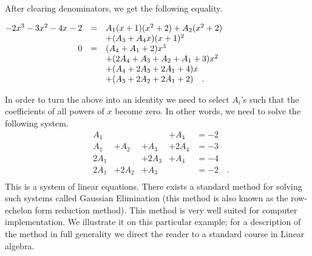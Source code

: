 {After clearing denominators, we get the following equality. 

\noindent$\begin{array}{@{}rcl@{}}
-2x^{3}-3x^{2}-4x -2 &=& A_{1} (x +1)(x^{2}+2)+A_{2} (x^{2}+2)\\
&&+(A_{3} + A_{4} x)(x +1)^{2}\\
0&=&(A_{4} +A_{1} +2)x^{3}\\
&&+(2A_{4} +A_{3} +A_{2} +A_{1} +3)x^{2}\\
&&+(A_{4} +2A_{3} +2A_{1} +4)x \\
&&+(A_{3} +2A_{2} +2A_{1} +2)\quad .
\end{array}
$

\noindent In order to turn the above into an identity we need to select $A_i$'s such that the coefficients of all powers of $x$ become zero. In other words, we need to solve the following system. 
\[
\begin{array}{llllll} & A_{1} & & & +A_{4} & =-2\\ & A_{1} & +A_{2} & +A_{3} & +2A_{4} & =-3\\ & 2A_{1} & & +2A_{3} & +A_{4} & =-4\\ & 2A_{1} & +2A_{2} & +A_{3} & & =-2\quad .\\
\end{array}
\] 
This is a system of linear equations. There exists a standard method for solving such systems called Gaussian Elimination (this method is also known as the row-echelon form reduction method). This method is very well suited for computer implementation. We illustrate it on this particular example; for a description of the method in full generality we direct the reader to a standard course in Linear algebra. 

}
